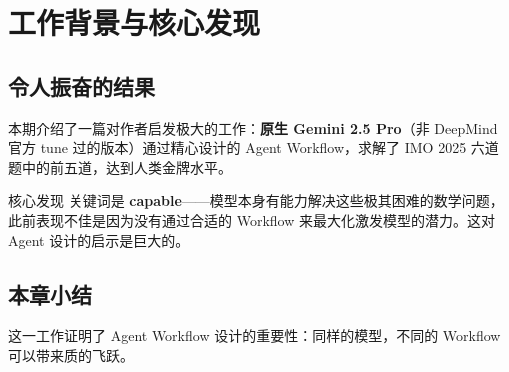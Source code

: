 \section{工作背景与核心发现}

\subsection{令人振奋的结果}

本期介绍了一篇对作者启发极大的工作：\textbf{原生 Gemini 2.5 Pro}（非 DeepMind 官方 tune 过的版本）通过精心设计的 Agent Workflow，求解了 IMO 2025 六道题中的前五道，达到人类金牌水平。

\begin{importantbox}{核心发现}
关键词是 \textbf{capable}——模型本身有能力解决这些极其困难的数学问题，此前表现不佳是因为没有通过合适的 Workflow 来最大化激发模型的潜力。这对 Agent 设计的启示是巨大的。
\end{importantbox}

\subsection{本章小结}

这一工作证明了 Agent Workflow 设计的重要性：同样的模型，不同的 Workflow 可以带来质的飞跃。

